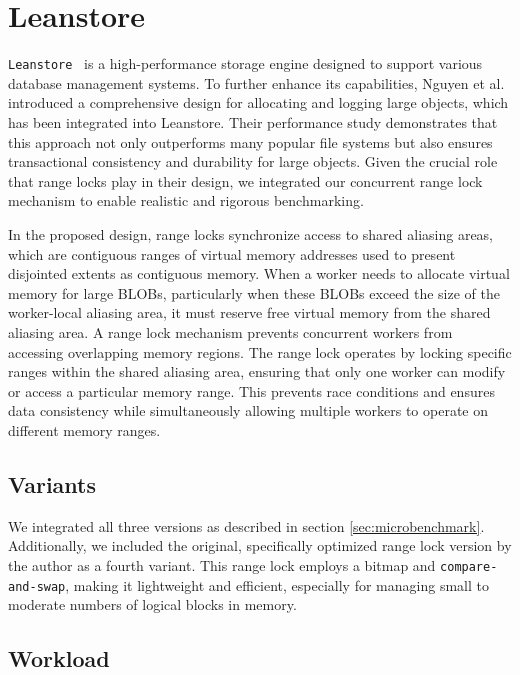 \newpage

\section{Leanstore}\label{sec:leanstore}

\texttt{Leanstore}~\parencite{leis2018leanstore} is a high-performance storage engine designed to support various database management systems. To further enhance its capabilities, Nguyen et al.~\parencite{nguyen2024files} introduced a comprehensive design for allocating and logging large objects, which has been integrated into Leanstore. Their performance study demonstrates that this approach not only outperforms many popular file systems but also ensures transactional consistency and durability for large objects. Given the crucial role that range locks play in their design, we integrated our concurrent range lock mechanism to enable realistic and rigorous benchmarking.

In the proposed design, range locks synchronize access to shared aliasing areas, which are contiguous ranges of virtual memory addresses used to present disjointed extents as contiguous memory. When a worker needs to allocate virtual memory for large BLOBs, particularly when these BLOBs exceed the size of the worker-local aliasing area, it must reserve free virtual memory from the shared aliasing area. A range lock mechanism prevents concurrent workers from accessing overlapping memory regions. The range lock operates by locking specific ranges within the shared aliasing area, ensuring that only one worker can modify or access a particular memory range. This prevents race conditions and ensures data consistency while simultaneously allowing multiple workers to operate on different memory ranges. 

\subsection{Variants}

We integrated all three versions as described in section \ref{sec:microbenchmark}. Additionally, we included the original, specifically optimized range lock version by the author as a fourth variant. This range lock employs a bitmap and \texttt{compare-and-swap}, making it lightweight and efficient, especially for managing small to moderate numbers of logical blocks in memory.

\subsection{Workload}


